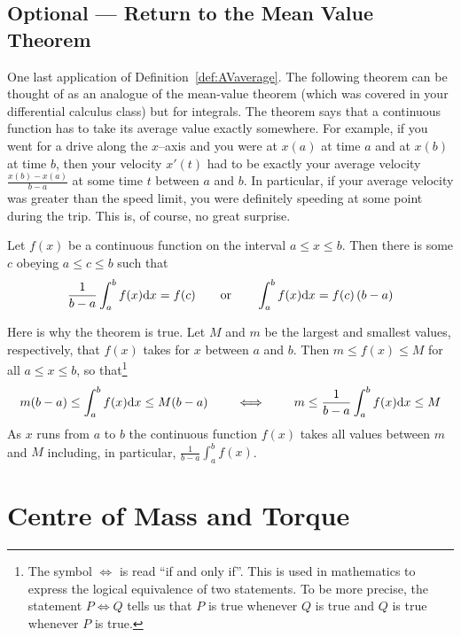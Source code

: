 \subsection*{Optional --- Return to the Mean Value Theorem}
One last application of Definition~\ref{def:AVaverage}. The following theorem can be
thought of as an analogue of the mean-value theorem (which was covered in your
differential calculus class) but for integrals. The theorem says that a
continuous function has to take its average value exactly somewhere. For example, if you
went for a drive along the $x$--axis and you were at $x(a)$ at time $a$ and at $x(b)$ at
time $b$, then your velocity $x'(t)$ had to be exactly your average velocity
$\frac{x(b)-x(a)}{b-a}$ at some time $t$ between $a$ and $b$. In particular,
if your average velocity was greater than the speed limit, you were definitely
speeding at some point during the trip. This is, of course, no great surprise.

\begin{theorem}\label{thm:AVmvt}
Let $f(x)$ be a continuous function on the interval $a\le x\le b$.
Then there is some $c$ obeying $a\le c \le b$ such that
\begin{align*}
\frac{1}{b-a}\int_a^b f(x)\mathrm{d}x=f(c) \qquad\text{or}\qquad
\int_a^b f(x)\mathrm{d}x = f(c)\,(b-a)
\end{align*}
\end{theorem}
Here is why the theorem is true. Let $M$ and $m$ be the largest and
smallest values, respectively, that $f(x)$ takes for $x$ between $a$ and $b$.
Then $m\le f(x)\le M$ for all $a\le x\le b$, so that\footnote{The symbol
$\iff$ is read ``if and only if''. This is used in mathematics to
express the logical equivalence of two statements. To be more precise,
the statement $P \iff Q$ tells us that $P$ is true whenever $Q$ is true
and $Q$ is true whenever $P$ is true.}
\begin{align*}
m(b-a)\le\int_a^b f(x)\mathrm{d}x\le M(b-a)\qquad\iff\qquad
m\le \frac{1}{b-a}\int_a^b f(x)\mathrm{d}x \le M
\end{align*}
As $x$ runs from $a$ to $b$  the continuous function $f(x)$ takes all values
between $m$ and $M$ including, in particular, $\frac{1}{b-a}\int_a^b f(x)$.

\section{Centre of Mass and Torque}\label{sec com}
